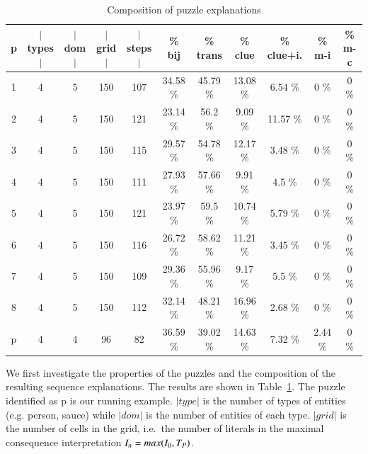 \begin{table}
	\centering
\begin{tabular}{c|cccc|cccccc}
     \textbf{p} &  \textbf{$|$types$|$} &  \textbf{$|$dom$|$} &  \textbf{$|$grid$|$} &  \textbf{$|$steps$|$} &  \textbf{\% bij} &  \textbf{\% trans} &  \textbf{\% clue} & \textbf{\% clue+i.} &   \textbf{\% m-i} &  \textbf{\% m-c} \\
    \hline
         1 &       4 &            5 &         150 &    107 &  34.58 \% &  45.79 \% &        13.08 \% &       6.54 \% &     0 \% &    0 \% \\
    2 &       4 &            5 &         150 &    121 &  23.14 \% &   56.2 \% &         9.09 \% &      11.57 \% &     0 \% &    0 \% \\
    3 &       4 &            5 &         150 &    115 &  29.57 \% &  54.78 \% &        12.17 \% &       3.48 \% &     0 \% &    0 \% \\
    4 &       4 &            5 &         150 &    111 &  27.93 \% &  57.66 \% &         9.91 \% &        4.5 \% &     0 \% &    0 \% \\
    5 &       4 &            5 &         150 &    121 &  23.97 \% &   59.5 \% &        10.74 \% &       5.79 \% &     0 \% &    0 \% \\
    6 &       4 &            5 &         150 &    116 &  26.72 \% &  58.62 \% &        11.21 \% &       3.45 \% &     0 \% &    0 \% \\
    7 &       4 &            5 &         150 &    109 &  29.36 \% &  55.96 \% &         9.17 \% &        5.5 \% &     0 \% &    0 \% \\
    8 &       4 &            5 &         150 &    112 &  32.14 \% &  48.21 \% &        16.96 \% &       2.68 \% &     0 \% &    0 \% \\
    p &       4 &            4 &          96 &     82 &  36.59 \% &  39.02 \% &        14.63 \% &       7.32 \% &  2.44 \% &    0 \%
    \end{tabular}
    \caption{Composition of puzzle explanations}
    \label{table:composition}
    \end{table}

We first investigate the properties of the puzzles and the composition of the resulting sequence explanations. The results are shown in Table~\ref{table:composition}. The puzzle identified as p is our running example. $|type|$ is the number of types of entities (e.g. person, sauce) while $|dom|$ is the number of entities of each type. $|grid|$ is the number of cells in the grid, i.e.\ the number of literals in the maximal consequence interpretation $I_n=max(I_0,T_P)$.



